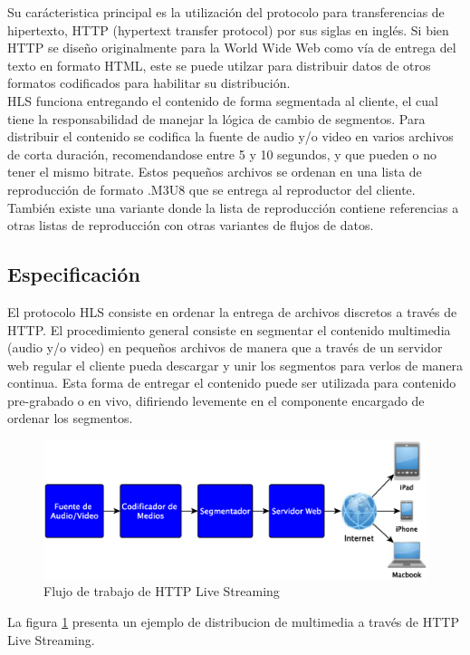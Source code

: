 Su carácteristica principal es la utilización del protocolo para transferencias de hipertexto, HTTP (hypertext transfer protocol) por sus siglas en inglés. Si bien HTTP se diseño originalmente para la World Wide Web como vía de entrega del texto en formato HTML, este se puede utilzar para distribuir datos de otros formatos codificados para habilitar su distribución.\\

HLS funciona entregando el contenido de forma segmentada al cliente, el cual tiene la responsabilidad de manejar la lógica de cambio de segmentos. Para distribuir el contenido se codifica la fuente de audio y/o video en varios archivos de corta duración, recomendandose entre 5 y 10 segundos, y que pueden o no tener el mismo bitrate. Estos pequeños archivos se ordenan en una lista de reproducción de formato .M3U8 que se entrega al reproductor del cliente. \\
También existe una variante donde la lista de reproducción contiene referencias a otras listas de reproducción con otras variantes de flujos de datos. \\

	\subsection{Especificación}
		El protocolo HLS consiste en ordenar la entrega de archivos discretos a través de HTTP.
		El procedimiento general consiste en segmentar el contenido multimedia (audio y/o video) en pequeños archivos de manera que a través de un servidor web regular el cliente pueda descargar y unir los segmentos para verlos de manera continua. Esta forma de entregar el contenido puede ser utilizada para contenido pre-grabado o en vivo, difiriendo levemente en el componente encargado de ordenar los segmentos.\\
		

\clearpage		
\begin{figure}[h!]
	\centering
	\includegraphics[scale=0.5]{imgs/HLS_diagram_wwdc2010.eps}
	\caption{Flujo de trabajo de HTTP Live Streaming}	
	\label{diagramaHLSwwdc2010}
\end{figure}		
		La figura \ref{diagramaHLSwwdc2010} presenta un ejemplo de distribucion de multimedia a través de HTTP Live Streaming.\\
		
